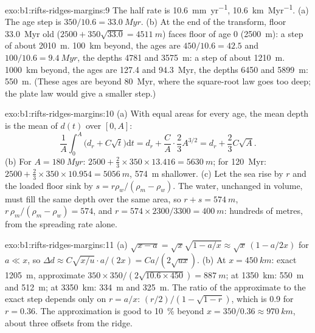 \begin{solution}{exo:b1:rifts-ridges-margins:9}
The half rate is \qty{10.6}{mm.yr^{-1}}, \qty{10.6}{km.Myr^{-1}}. (a) The age
step is $350/10.6 = \qty{33.0}{Myr}$. (b) At the end of the transform, floor
\qty{33.0}{Myr} old ($2500 + 350\sqrt{33.0} = \qty{4511}{m}$) faces floor of
age 0 (\qty{2500}{m}): a step of about \qty{2010}{m}. \qty{100}{km} beyond,
the ages are $450/10.6 = 42.5$ and $100/10.6 = \qty{9.4}{Myr}$, the depths
4781 and \qty{3575}{m}: a step of about \qty{1210}{m}. \qty{1000}{km} beyond,
the ages are 127.4 and \qty{94.3}{Myr}, the depths 6450 and \qty{5899}{m}:
\qty{550}{m}. (These ages are beyond \qty{80}{Myr}, where the square-root law
goes too deep; the plate law would give a smaller step.)
\end{solution}

\begin{solution}{exo:b1:rifts-ridges-margins:10}
(a) With equal areas for every age, the mean depth is the mean of $d(t)$ over
$[0, A]$:
\[
  \frac1A\int_0^A\bigl(d_r + C\sqrt t\bigr)\mathrm dt = d_r + \frac CA\cdot\frac23A^{3/2}
  = d_r + \frac23C\sqrt A.
\]
(b) For $A = \qty{180}{Myr}$: $2500 + \frac23\times350\times13.416 =
\qty{5630}{m}$; for \qty{120}{Myr}: $2500 + \frac23\times350\times10.954 =
\qty{5056}{m}$, \qty{574}{m} shallower. (c) Let the sea rise by $r$ and the
loaded floor sink by $s = r\rho_w/(\rho_m - \rho_w)$. The water, unchanged in
volume, must fill the same depth over the same area, so $r + s = \qty{574}{m}$,
$r\,\rho_m/(\rho_m - \rho_w) = 574$, and $r = 574\times2300/3300 =
\qty{400}{m}$: hundreds of metres, from the spreading rate alone.
\end{solution}

\begin{solution}{exo:b1:rifts-ridges-margins:11}
(a) $\sqrt{x - a} = \sqrt x\sqrt{1 - a/x} \approx \sqrt x\,(1 - a/2x)$ for
$a \ll x$, so
$\Delta d \approx C\sqrt{x/u}\cdot a/(2x) = Ca/(2\sqrt{ux})$.
(b) At $x = \qty{450}{km}$: exact \qty{1205}{m}, approximate
$350\times350/(2\sqrt{10.6\times450}) = \qty{887}{m}$; at \qty{1350}{km}:
\qty{550}{m} and \qty{512}{m}; at \qty{3350}{km}: \qty{334}{m} and
\qty{325}{m}. The ratio of the approximate to the exact step depends only on
$r = a/x$: $(r/2)/(1 - \sqrt{1 - r})$, which is 0.9 for $r = 0.36$. The
approximation is good to \qty{10}{\percent} beyond $x = 350/0.36 \approx
\qty{970}{km}$, about three offsets from the ridge.
\end{solution}

